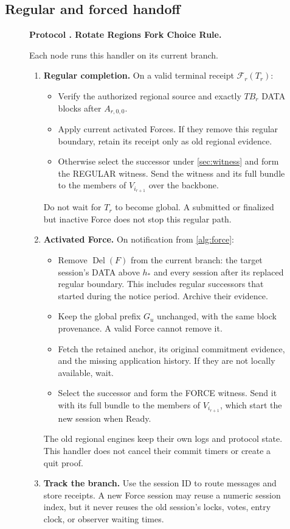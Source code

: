 \documentclass[11pt,a4paper]{article}
\newcommand{\FC}{\mathcal F}
\newcommand{\Del}{\operatorname{Del}}
\newcommand{\TB}{\mathit{TB}}
\newcounter{protocol}
\newenvironment{protocol}[2]{\begin{figure}[htbp]\refstepcounter{protocol}\label{#1}
\begin{mdframed}[linewidth=.6pt,skipabove=0pt,skipbelow=0pt,
innertopmargin=7pt,innerbottommargin=7pt]\small
\textbf{Protocol \theprotocol. #2}\par\smallskip}{\end{mdframed}\end{figure}}
\begin{document}
\subsection{Regular and forced handoff}
\begin{protocol}{alg:rotation}{Rotate Regions Fork Choice Rule.}
Each node runs this handler on its current branch.
\begin{enumerate}[label=\textbf{\arabic*)},itemsep=3pt]
\item \textbf{Regular completion.} On a valid terminal receipt
$\FC_r(T_r)$:
\begin{itemize}
\item Verify the authorized regional source and exactly $\TB_r$ DATA
blocks after $A_{r,0,0}$.
\item Apply current activated Forces. If they remove this regular
boundary, retain its receipt only as old regional evidence.
\item Otherwise select the successor under \cref{sec:witness} and
form the REGULAR witness. Send the witness and its full
bundle to the members of $V_{i_{r+1}}$ over the backbone.
\end{itemize}
Do not wait for $T_r$ to become global. A submitted or finalized but
inactive Force does not stop this regular path.

\item \textbf{Activated Force.} On notification from \cref{alg:force}:
\begin{itemize}
\item Remove $\Del(F)$ from the current branch: the target
session's DATA above $h_*$ and every session after its replaced regular
boundary. This includes regular successors that started during the notice period.
Archive their evidence.
\item Keep the global prefix $G_u$ unchanged, with the same
block provenance. A valid Force cannot remove it.
\item Fetch the retained anchor, its original commitment evidence, and the missing
application history. If they are not locally available, wait.
\item Select the successor and form the FORCE witness. Send
it with its full bundle to the members of $V_{i_{r+1}}$, which start the
new session when Ready.
\end{itemize}
The old regional engines keep their own logs and protocol state. This
handler does not cancel their commit timers or create a quit proof.

\item \textbf{Track the branch.} Use the session ID to route
messages and store receipts. A new Force session may reuse a numeric
session index, but it never reuses the old session's locks, votes,
entry clock, or observer waiting times.
\end{enumerate}
\end{protocol}
\end{document}
